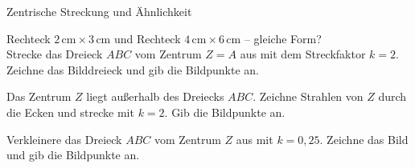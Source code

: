 \setcounter{aufgabe}{15}

\begin{aufgabe}{Zentrische Streckung und Ähnlichkeit}
\begin{teile}
\teil Rechteck $2\,\text{cm} \times 3\,\text{cm}$ und Rechteck $4\,\text{cm} \times 6\,\text{cm}$ – gleiche Form?  \\ 
\teil Strecke das Dreieck $ABC$ vom Zentrum $Z = A$ aus mit dem Streckfaktor $k = 2$. Zeichne das Bilddreieck und gib die Bildpunkte an.

\begin{ksys}[xmin=0,xmax=10,ymin=0,ymax=7]\end{ksys}
\teil Das Zentrum $Z$ liegt außerhalb des Dreiecks $ABC$. Zeichne Strahlen von $Z$ durch die Ecken und strecke mit $k = 2$. Gib die Bildpunkte an.

\begin{ksys}[xmin=0,xmax=10,ymin=0,ymax=7]\end{ksys}
\teil Verkleinere das Dreieck $ABC$ vom Zentrum $Z$ aus mit $k = 0{,}25$. Zeichne das Bild und gib die Bildpunkte an.


\end{teile}
\end{aufgabe}
